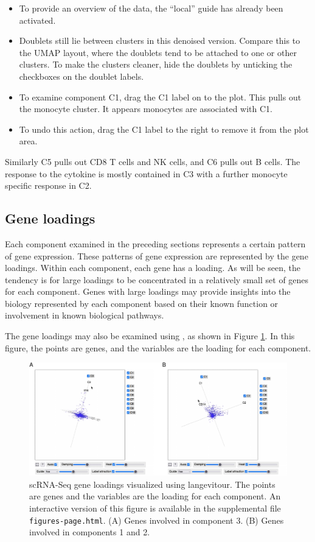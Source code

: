 \begin{itemize}
\item
  To provide an overview of the data, the ``local'' guide has already been activated.
\item
  Doublets still lie between clusters in this denoised version. Compare this to the UMAP layout, where the doublets tend to be attached to one or other clusters. To make the clusters cleaner, hide the doublets by unticking the checkboxes on the doublet labels.
\item
  To examine component C1, drag the C1 label on to the plot. This pulls out the monocyte cluster. It appears monocytes are associated with C1.
\item
  To undo this action, drag the C1 label to the right to remove it from the plot area.
\end{itemize}

Similarly
C5
pulls out CD8 T cells and NK cells, and
C6
pulls out B cells.
The response to the cytokine is mostly contained in
C3
with a further monocyte specific response in
C2.

\hypertarget{geneloadings}{%
\subsection{Gene loadings}\label{geneloadings}}

Each component examined in the preceding sections represents a certain pattern of gene expression. These patterns of gene expression are represented by the gene loadings. Within each component, each gene has a loading. As will be seen, the tendency is for large loadings to be concentrated in a relatively small set of genes for each component. Genes with large loadings may provide insights into the biology represented by each component based on their known function or involvement in known biological pathways.

The gene loadings may also be examined using , as shown in Figure \ref{fig:gene}. In this figure, the points are genes, and the variables are the loading for each component.

\begin{figure}
\centering
\includegraphics{langevitour-article_files/figure-latex/gene-1.pdf}
\caption{\label{fig:gene}scRNA-Seq gene loadings visualized using langevitour. The points are genes and the variables are the loading for each component. An interactive version of this figure is available in the supplemental file \texttt{figures-page.html}. (A) Genes involved in component 3. (B) Genes involved in components 1 and 2.}
\end{figure}

